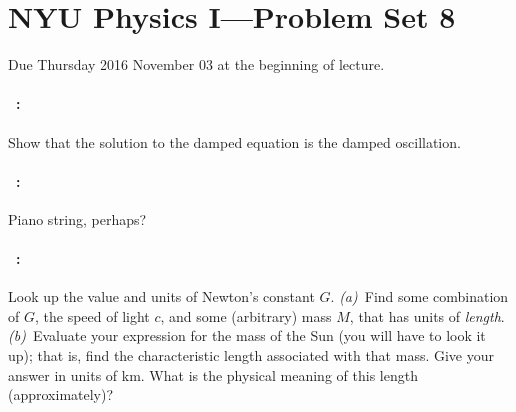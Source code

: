 \documentclass[12pt]{article}
\begin{document}
\section*{NYU Physics I---Problem Set 8}

Due Thursday 2016 November 03 at the beginning of lecture.

\paragraph{\problemname~\theproblem:}%
Show that the solution to the damped equation is the damped oscillation.

\paragraph{\problemname~\theproblem:}%
Piano string, perhaps?

\paragraph{\problemname~\theproblem:}%
Look up the value and units of Newton's constant $G$.
\textsl{(a)}~Find some combination of $G$, the speed of light $c$, and
some (arbitrary) mass $M$, that has units of \emph{length}.
\textsl{(b)}~Evaluate your expression for the mass of the Sun (you
will have to look it up); that is, find the characteristic length
associated with that mass.  Give your answer in units of km.  What is
the physical meaning of this length (approximately)?
\end{document}
